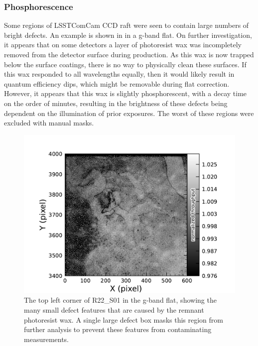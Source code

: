 \subsubsection{Phosphorescence}
Some regions of LSSTComCam CCD raft were seen to contain large numbers of bright defects.
An example is shown in   in a g-band flat. 
On further investigation, it appears that on some detectors a layer of photoresist wax was incompletely removed from the detector surface during production.
As this wax is now trapped below the surface coatings, there is no way to physically clean these surfaces.
If this wax responded to all wavelengths equally, then it would likely result in quantum efficiency dips, which might be removable during flat correction.
However, it appears that this wax is slightly phosphorescent, with a decay time on the order of minutes, resulting in the brightness of these defects being dependent on the illumination of prior exposures.
The worst of these regions were excluded with manual masks.
\begin{figure}[htb!]
  \centering
  \includegraphics[width=0.98\linewidth]{figures/dp1_isr_anomalies-phosphorescence.pdf}
  \caption{The top left corner of R22\_S01 in the g-band flat, showing the many small defect features that are caused by the remnant photoresist wax.
  A single large defect box masks this region from further analysis to prevent these features from contaminating measurements.}
  \label{fig:anomalies_phosphorescence}
\end{figure}

